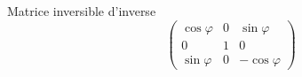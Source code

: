 Matrice inversible d'inverse
\begin{displaymath}
  \begin{pmatrix}
  \cos \varphi & 0 & \sin \varphi \\
   0           & 1 & 0     \\
  \sin \varphi & 0 & -\cos \varphi
\end{pmatrix}
\end{displaymath}
